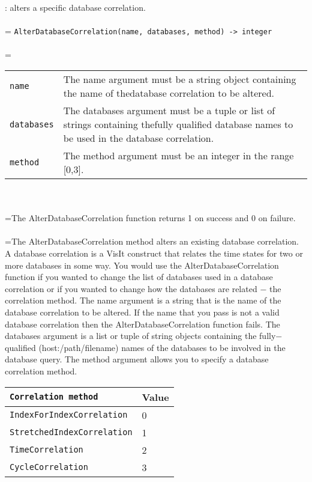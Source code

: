 \documentclass[10pt,a4paper]{report}
\begin{document}
{}
: alters a specific database correlation.\\[-3mm]

 \\ 
\hangindent=\parindent 
\verb!AlterDatabaseCorrelation(name, databases, method) -> integer!\\ [-3mm]

 \\ 
\hangindent=\parindent 
\begin{tabular}{lp{9cm}}
\verb!name! & The name argument must be a string object containing the name of thedatabase correlation to be altered. \\
\verb!databases! & The databases argument must be a tuple or list of strings containing thefully qualified database names to be used in the database correlation. \\
\verb!method! & The method argument must be an integer in the range [0,3]. \\
\end{tabular} \\[-2mm]


 \\ 
\hangindent=\parindent The AlterDatabaseCorrelation function returns 1 on success and 0 on failure. \\[-3mm] 

 \\ 
\hangindent=\parindent The AlterDatabaseCorrelation method alters an existing database correlation. A database correlation is a VisIt construct that relates the time states for two or more databases in some way. You would use the AlterDatabaseCorrelation function if you wanted to change the list of databases used in a database correlation or if you wanted to change how the databases are related $-$ the correlation method. The name argument is a string that is the name of the database correlation to be altered. If the name that you pass is not a valid database correlation then the AlterDatabaseCorrelation function fails. The databases argument is a list or tuple of string objects containing the fully$-$qualified (host:/path/filename) names of the databases to be involved in the database query. The method argument allows you to specify a database correlation method. \\

\begin{tabular}{|l|l|}
\hline
\verb!Correlation method! & Value \\
\hline \hline
\verb!IndexForIndexCorrelation! & 0 \\
\verb!StretchedIndexCorrelation! & 1 \\
\verb!TimeCorrelation! & 2 \\
\verb!CycleCorrelation! & 3 \\
\hline
\end{tabular} \\[-2mm]
\\[-3mm] 
\end{document}

